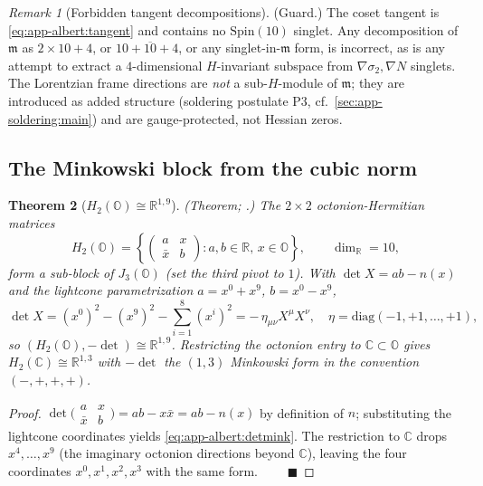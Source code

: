 \documentclass[11pt]{article}
\theoremstyle{plain}
\newtheorem{theorem}{Theorem}[section]
\theoremstyle{definition}
\theoremstyle{remark}
\newtheorem{remark}[theorem]{Remark}
\begin{document}
\begin{remark}[Forbidden tangent decompositions]\label{rmk:app-albert:forbidden}
\textup{(Guard.)}
The coset tangent is \eqref{eq:app-albert:tangent} and contains no
$\mathrm{Spin}(10)$ singlet. Any decomposition of $\mathfrak m$ as $2\times10+4$,
or $10+\overline{10}+4$, or any singlet-in-$\mathfrak m$ form, is incorrect, as is
any attempt to extract a $4$-dimensional $H$-invariant subspace from
$\nabla\sigma_2,\nabla N$ singlets. The Lorentzian frame directions are
\emph{not} a sub-$H$-module of $\mathfrak m$; they are introduced as added
structure (soldering postulate P3, cf.\ \autoref{sec:app-soldering:main}) and are
gauge-protected, not Hessian zeros.
\end{remark}

\subsection{The Minkowski block from the cubic norm}
\label{sec:app-albert:minkowski}

\begin{theorem}[$H_2(\mathbb O)\cong\mathbb R^{1,9}$]\label{thm:app-albert:minkowski}
\textup{(Theorem; \cite{Baez:2002,Sudbery:1984}.)}
The $2\times2$ octonion-Hermitian matrices
\begin{equation}\label{eq:app-albert:H2O}
  H_2(\mathbb O)=
  \left\{\begin{pmatrix}a & x\\ \bar x & b\end{pmatrix}:a,b\in\mathbb R,\,x\in
  \mathbb O\right\},
  \qquad \dim_{\mathbb R}=10,
\end{equation}
form a sub-block of $J_3(\mathbb O)$ (set the third pivot to $1$). With
$\det X=ab-n(x)$ and the lightcone parametrization $a=x^0+x^9$, $b=x^0-x^9$,
\begin{equation}\label{eq:app-albert:detmink}
  \det X=(x^0)^2-(x^9)^2-\textstyle\sum_{i=1}^{8}(x^i)^2
  =-\,\eta_{\mu\nu}X^\mu X^\nu,
  \quad \eta=\mathrm{diag}(-1,+1,\dots,+1),
\end{equation}
so $(H_2(\mathbb O),-\det)\cong\mathbb R^{1,9}$. Restricting the octonion entry to
$\mathbb C\subset\mathbb O$ gives $H_2(\mathbb C)\cong\mathbb R^{1,3}$ with
$-\det$ the $(1,3)$ Minkowski form in the convention $(-,+,+,+)$.
\end{theorem}

\begin{proof}
$\det\!\bigl(\begin{smallmatrix}a&x\\\bar x&b\end{smallmatrix}\bigr)
=ab-x\bar x=ab-n(x)$ by definition of $n$; substituting the lightcone
coordinates yields \eqref{eq:app-albert:detmink}. The restriction to
$\mathbb C$ drops $x^4,\dots,x^9$ (the imaginary octonion directions beyond
$\mathbb C$), leaving the four coordinates $x^0,x^1,x^2,x^3$ with the same form.
$\qquad\blacksquare$
\end{proof}
\end{document}
